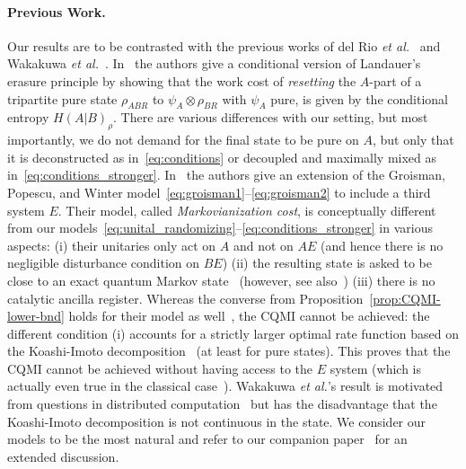 \documentclass[a4paper,aps,prl,twocolumn,10pt,superscriptaddress]{revtex4-1}
\theoremstyle{plain}
\theoremstyle{definition}
\begin{document}
\paragraph{Previous Work.} Our results are to be contrasted with the previous works of del Rio {\it et al.}~\cite{RARDV10} and Wakakuwa {\it et al.}~\cite{WSM15}. In~\cite{RARDV10} the authors give a conditional version of Landauer's erasure principle by showing that the work cost of {\it resetting} the $A$-part of a tripartite pure state $\rho_{ABR}$ to $\psi_A\otimes\rho_{BR}$ with $\psi_A$ pure, is given by the conditional entropy $H(A|B)_\rho$. There are various differences with our setting, but most importantly, we do not demand for the final state to be pure on $A$, but only that it is deconstructed as in~\eqref{eq:conditions} or decoupled and maximally mixed as in~\eqref{eq:conditions_stronger}. In~\cite{WSM15} the authors give an extension of the Groisman, Popescu, and Winter model~\eqref{eq:groisman1}--\eqref{eq:groisman2} to include a third system $E$. Their model, called {\it Markovianization cost}, is conceptually different from our models~\eqref{eq:unital_randomizing}--\eqref{eq:conditions_stronger} in various aspects: (i) their unitaries only act on $A$ and not on $AE$ (and hence there is no negligible disturbance condition on $BE$) (ii) the resulting state is asked to be close to an exact quantum Markov state~\cite{AF83} (however, see also~\cite{WSM15a}) (iii) there is no catalytic ancilla register. Whereas the converse from Proposition~\ref{prop:CQMI-lower-bnd} holds for their model as well~\cite{WSM15a}, the CQMI cannot be achieved: the different condition (i) accounts for a strictly larger optimal rate function based on the Koashi-Imoto decomposition~\cite{koashi02} (at least for pure states). This proves that the CQMI cannot be achieved without having access to the $E$ system (which is actually even true in the classical case~\cite{BBMW_full16}). Wakakuwa {\it et al.}'s result is motivated from questions in distributed computation~\cite{WSM15_2} but has the disadvantage that the Koashi-Imoto decomposition is not continuous in the state. We consider our models to be the most natural and refer to our companion paper~\cite{BBMW_full16} for an extended discussion.

\end{document}
